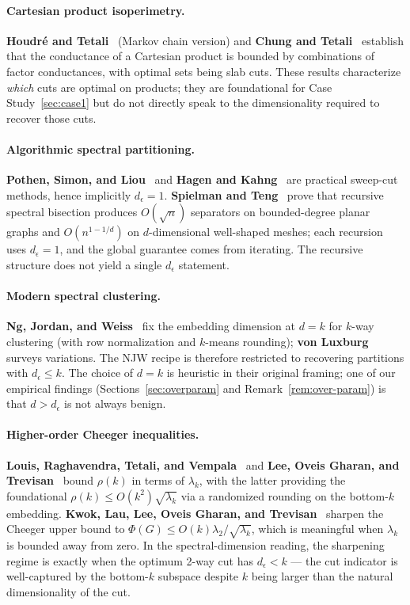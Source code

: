 \documentclass{article}
\theoremstyle{definition}
\theoremstyle{remark}
\begin{document}
\paragraph{Cartesian product isoperimetry.} \textbf{Houdr\'e and Tetali}~\cite{houdre1996isoperimetric} (Markov chain version) and \textbf{Chung and Tetali}~\cite{chung1998isoperimetric} establish that the conductance of a Cartesian product is bounded by combinations of factor conductances, with optimal sets being slab cuts. These results characterize \emph{which} cuts are optimal on products; they are foundational for Case Study~\ref{sec:case1} but do not directly speak to the dimensionality required to recover those cuts.

\paragraph{Algorithmic spectral partitioning.} \textbf{Pothen, Simon, and Liou}~\cite{pothen1990partitioning} and \textbf{Hagen and Kahng}~\cite{hagen1992new} are practical sweep-cut methods, hence implicitly $d_\epsilon = 1$. \textbf{Spielman and Teng}~\cite{spielman1996spectral, spielman2007spectral} prove that recursive spectral bisection produces $O(\sqrt{n})$ separators on bounded-degree planar graphs and $O(n^{1-1/d})$ on $d$-dimensional well-shaped meshes; each recursion uses $d_\epsilon = 1$, and the global guarantee comes from iterating. The recursive structure does not yield a single $d_\epsilon$ statement.

\paragraph{Modern spectral clustering.} \textbf{Ng, Jordan, and Weiss}~\cite{ng2001spectral} fix the embedding dimension at $d = k$ for $k$-way clustering (with row normalization and $k$-means rounding); \textbf{von Luxburg}~\cite{luxburg2007tutorial} surveys variations. The NJW recipe is therefore restricted to recovering partitions with $d_\epsilon \leq k$. The choice of $d = k$ is heuristic in their original framing; one of our empirical findings (Sections~\ref{sec:overparam} and Remark~\ref{rem:over-param}) is that $d > d_\epsilon$ is not always benign.

\paragraph{Higher-order Cheeger inequalities.} \textbf{Louis, Raghavendra, Tetali, and Vempala}~\cite{louis2012many} and \textbf{Lee, Oveis Gharan, and Trevisan}~\cite{lee2014multiway} bound $\rho(k)$ in terms of $\lambda_k$, with the latter providing the foundational $\rho(k) \leq O(k^2)\sqrt{\lambda_k}$ via a randomized rounding on the bottom-$k$ embedding. \textbf{Kwok, Lau, Lee, Oveis Gharan, and Trevisan}~\cite{kwok2013improved} sharpen the Cheeger upper bound to $\Phi(G) \leq O(k) \lambda_2 / \sqrt{\lambda_k}$, which is meaningful when $\lambda_k$ is bounded away from zero. In the spectral-dimension reading, the sharpening regime is exactly when the optimum 2-way cut has $d_\epsilon < k$ --- the cut indicator is well-captured by the bottom-$k$ subspace despite $k$ being larger than the natural dimensionality of the cut.
\end{document}
